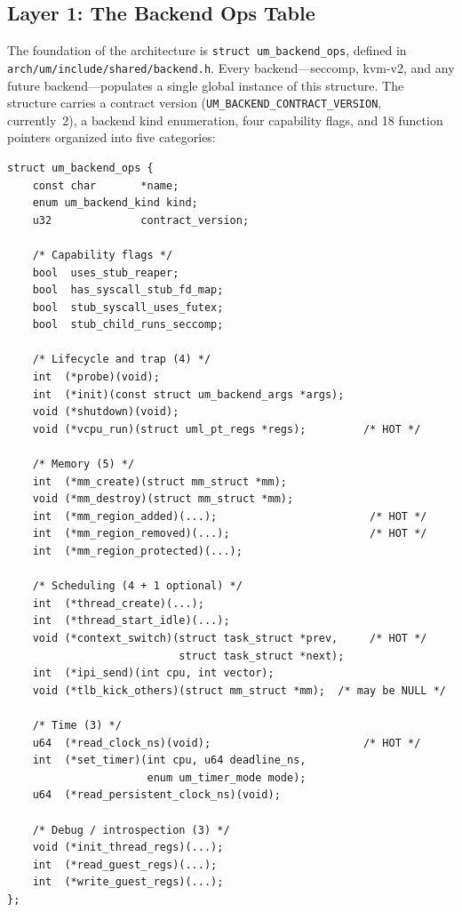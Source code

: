 \subsection{Layer 1: The Backend Ops Table}
\label{sec:layer1}

The foundation of the architecture is \texttt{struct um\_backend\_ops}, defined
in \texttt{arch/um/include/shared/backend.h}.  Every backend---seccomp,
kvm-v2, and any future backend---populates a single global instance of this
structure.  The structure carries a contract version
(\texttt{UM\_BACKEND\_CONTRACT\_VERSION}, currently~2), a backend kind
enumeration, four capability flags, and 18 function pointers organized into
five categories:

\begin{lstlisting}[language=KernelC, caption={Abbreviated
  \texttt{struct um\_backend\_ops} (from
  \texttt{arch/um/include/shared/backend.h}).},
  label={lst:backend-ops}]
struct um_backend_ops {
    const char       *name;
    enum um_backend_kind kind;
    u32              contract_version;

    /* Capability flags */
    bool  uses_stub_reaper;
    bool  has_syscall_stub_fd_map;
    bool  stub_syscall_uses_futex;
    bool  stub_child_runs_seccomp;

    /* Lifecycle and trap (4) */
    int  (*probe)(void);
    int  (*init)(const struct um_backend_args *args);
    void (*shutdown)(void);
    void (*vcpu_run)(struct uml_pt_regs *regs);         /* HOT */

    /* Memory (5) */
    int  (*mm_create)(struct mm_struct *mm);
    void (*mm_destroy)(struct mm_struct *mm);
    int  (*mm_region_added)(...);                        /* HOT */
    int  (*mm_region_removed)(...);                      /* HOT */
    int  (*mm_region_protected)(...);

    /* Scheduling (4 + 1 optional) */
    int  (*thread_create)(...);
    int  (*thread_start_idle)(...);
    void (*context_switch)(struct task_struct *prev,     /* HOT */
                           struct task_struct *next);
    int  (*ipi_send)(int cpu, int vector);
    void (*tlb_kick_others)(struct mm_struct *mm);  /* may be NULL */

    /* Time (3) */
    u64  (*read_clock_ns)(void);                        /* HOT */
    int  (*set_timer)(int cpu, u64 deadline_ns,
                      enum um_timer_mode mode);
    u64  (*read_persistent_clock_ns)(void);

    /* Debug / introspection (3) */
    void (*init_thread_regs)(...);
    int  (*read_guest_regs)(...);
    int  (*write_guest_regs)(...);
};
\end{lstlisting}

